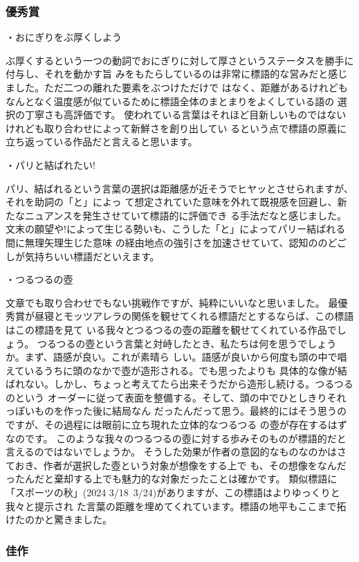 \subsubsection{優秀賞}

・おにぎりをぶ厚くしよう

ぶ厚くするという一つの動詞でおにぎりに対して厚さというステータスを勝手に付与し、それを動かす旨
みをもたらしているのは非常に標語的な営みだと感じました。ただ二つの離れた要素をぶつけただけで
はなく、距離があるけれどもなんとなく温度感が似ているために標語全体のまとまりをよくしている語の
選択の丁寧さも高評価です。
使われている言葉はそれほど目新しいものではないけれども取り合わせによって新鮮さを創り出してい
るという点で標語の原義に立ち返っている作品だと言えると思います。

・パリと結ばれたい!

パリ、結ばれるという言葉の選択は距離感が近そうでヒヤッとさせられますが、それを助詞の「と」によっ
て想定されていた意味を外れて既視感を回避し、新たなニュアンスを発生させていて標語的に評価でき
る手法だなと感じました。
文末の願望や!によって生じる勢いも、こうした「と」によってパリー結ばれる間に無理矢理生じた意味
の経由地点の強引さを加速させていて、認知ののどごしが気持ちいい標語だといえます。

・つるつるの壺

文章でも取り合わせでもない挑戦作ですが、純粋にいいなと思いました。
最優秀賞が昼寝とモッツアレラの関係を観せてくれる標語だとするならば、この標語はこの標語を見て
いる我々とつるつるの壺の距離を観せてくれている作品でしょう。
つるつるの壺という言葉と対峙したとき、私たちは何を思うでしょうか。まず、語感が良い。これが素晴ら
しい。語感が良いから何度も頭の中で唱えているうちに頭のなかで壺が造形される。でも思ったよりも
具体的な像が結ばれない。しかし、ちょっと考えてたら出来そうだから造形し続ける。つるつるのという
オーダーに従って表面を整備する。そして、頭の中でひとしきりそれっぽいものを作った後に結局なん
だったんだって思う。最終的にはそう思うのですが、その過程には眼前に立ち現れた立体的なつるつる
の壺が存在するはずなのです。
このような我々のつるつるの壺に対する歩みそのものが標語的だと言えるのではないでしょうか。
そうした効果が作者の意図的なものなのかはさておき、作者が選択した壺という対象が想像をする上で
も、その想像をなんだったんだと棄却する上でも魅力的な対象だったことは確かです。
類似標語に「スポーツの秋」(2024 3/18~3/24)がありますが、この標語はよりゆっくりと我々と提示され
た言葉の距離を埋めてくれています。標語の地平もここまで拓けたのかと驚きました。

\subsubsection{佳作}

